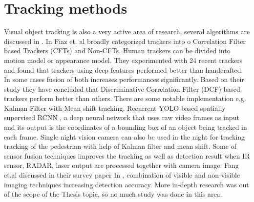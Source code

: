 \section{Tracking methods}
Visual object tracking is also a very active area of research, several algorithms are discussed in \cite{fiaz2019handcrafted,xu2005pedestrian,ning2017spatially}.
In \cite{fiaz2019handcrafted} Fiaz et. al broadly categorized trackers into o Correlation Filter based Trackers (CFTs) and Non-CFTs. Human trackers can be divided into motion model or appearance model. They experimented with 24 recent trackers and found that trackers using deep features performed better than handcrafted. In some cases fusion of both increases performances significantly. Based on their study they have concluded that Discriminative Correlation Filter (DCF) based trackers perform better than others. There are some notable implementation e.g. 
Kalman Filter with Mean shift tracking, Recurrent YOLO based spatially supervised RCNN \cite{ning2017spatially}, a deep neural network that uses raw video frames as input and its output is the coordinates of a bounding box of an object being tracked in each frame. Single night vision camera can also be used in the night for tracking tracking of the pedestrian with help of Kalman filter and mean shift. Some of sensor fusion techniques improves the tracking as well as detection result when IR sensor, RADAR, laser output are processed together with camera image. Fang et.al discussed in their survey paper In \cite{gonzalez2016pedestrian}, combination of visible and non-visible imaging techniques increasing detection accuracy. More in-depth research was out of the scope of the Thesis topic, so no much study was done in this area.

